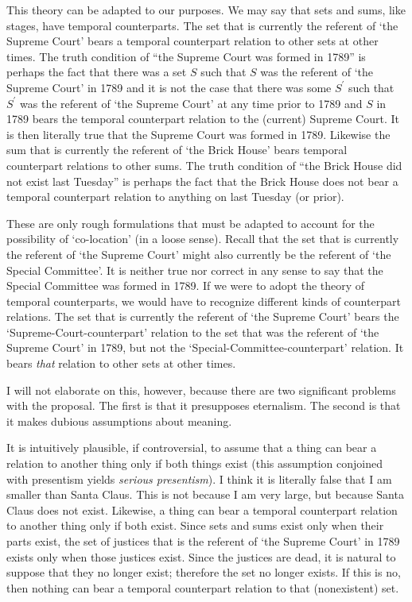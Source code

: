 \documentclass[11pt]{article}
\begin{document}
\begin{spacing}{1.5}
This theory can be adapted to our purposes.  We may say that sets and
sums, like stages, have temporal counterparts.  The set that is
currently the referent of `the Supreme Court' bears a temporal
counterpart relation to other sets at other times.  The truth
condition of ``the Supreme Court was formed in 1789'' is perhaps the
fact that there was a set $S$ such that $S$ was the referent of `the
Supreme Court' in 1789 and it is not the case that there was some
$S^{\prime}$ such that $S^{\prime}$ was the referent of `the Supreme
Court' at any time prior to 1789 and $S$ in 1789 bears the temporal
counterpart relation to the (current) Supreme Court.  It is then
literally true that the Supreme Court was formed in 1789.  Likewise
the sum that is currently the referent of `the Brick House' bears
temporal counterpart relations to other sums.  The truth condition of
``the Brick House did not exist last Tuesday'' is perhaps the fact
that the Brick House does not bear a temporal counterpart relation to
anything on last Tuesday (or prior).

These are only rough formulations that must be adapted to account for
the possibility of `co-location' (in a loose sense).  Recall that the
set that is currently the referent of `the Supreme Court' might also
currently be the referent of `the Special Committee'.  It is neither
true nor correct in any sense to say that the Special Committee was
formed in 1789.  If we were to adopt the theory of temporal
counterparts, we would have to recognize different kinds of
counterpart relations.  The set that is currently the referent of `the
Supreme Court' bears the `Supreme-Court-counterpart' relation to the
set that was the referent of `the Supreme Court' in 1789, but not the
`Special-Committee-counterpart' relation.  It bears {\em that}
relation to other sets at other times.

I will not elaborate on this, however, because there are two
significant problems with the proposal.  The first is that it
presupposes eternalism.  The second is that it makes dubious
assumptions about meaning.

It is intuitively plausible, if controversial, to assume that a thing
can bear a relation to another thing only if both things exist (this
assumption conjoined with presentism yields {\em serious presentism}).
I think it is literally false that I am smaller than Santa Claus.
This is not because I am very large, but because Santa Claus does not
exist.  Likewise, a thing can bear a temporal counterpart relation to
another thing only if both exist.  Since sets and sums exist only when
their parts exist, the set of justices that is the referent of `the
Supreme Court' in 1789 exists only when those justices exist.  Since
the justices are dead, it is natural to suppose that they no longer
exist; therefore the set no longer exists.  If this is no, then
nothing can bear a temporal counterpart relation to that (nonexistent)
set.


\end{spacing}
\end{document}
